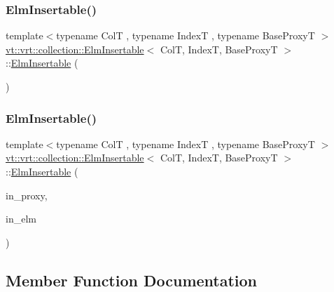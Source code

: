 \subsubsection{\texorpdfstring{Elm\+Insertable()}{ElmInsertable()}\hspace{0.1cm}{\footnotesize\ttfamily [1/2]}}
{\footnotesize\ttfamily template$<$typename ColT , typename IndexT , typename Base\+ProxyT $>$ \\
\hyperlink{structvt_1_1vrt_1_1collection_1_1_elm_insertable}{vt\+::vrt\+::collection\+::\+Elm\+Insertable}$<$ ColT, IndexT, Base\+ProxyT $>$\+::\hyperlink{structvt_1_1vrt_1_1collection_1_1_elm_insertable}{Elm\+Insertable} (\begin{DoxyParamCaption}{ }\end{DoxyParamCaption})\hspace{0.3cm}{\ttfamily [default]}}

\mbox{\label{structvt_1_1vrt_1_1collection_1_1_elm_insertable_adbe57f67f3d9648a9ec8434ecdde0bd6}} 
\subsubsection{\texorpdfstring{Elm\+Insertable()}{ElmInsertable()}\hspace{0.1cm}{\footnotesize\ttfamily [2/2]}}
{\footnotesize\ttfamily template$<$typename ColT , typename IndexT , typename Base\+ProxyT $>$ \\
\hyperlink{structvt_1_1vrt_1_1collection_1_1_elm_insertable}{vt\+::vrt\+::collection\+::\+Elm\+Insertable}$<$ ColT, IndexT, Base\+ProxyT $>$\+::\hyperlink{structvt_1_1vrt_1_1collection_1_1_elm_insertable}{Elm\+Insertable} (\begin{DoxyParamCaption}\item[{typename Base\+Proxy\+T\+::\+Proxy\+Type const \&}]{in\+\_\+proxy,  }\item[{typename Base\+Proxy\+T\+::\+Element\+Proxy\+Type const \&}]{in\+\_\+elm }\end{DoxyParamCaption})}



\subsection{Member Function Documentation}
\mbox{\label{structvt_1_1vrt_1_1collection_1_1_elm_insertable_a0ba9cf2ab8ea1f06571b8c984286dff1}} 
